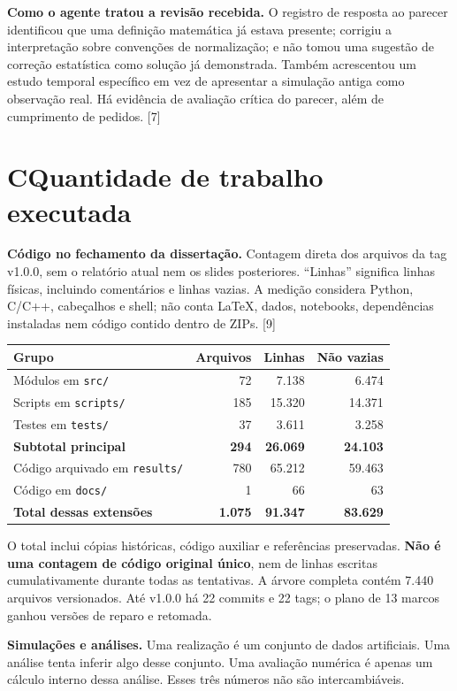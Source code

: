 \documentclass[11pt,a4paper]{article}
\newcommand{\fonte}[1]{{\small\color{navy}[#1]}}
\newcommand{\titulo}[2]{\section*{\color{navy}#1\quad #2}}
\begin{document}
\textbf{Como o agente tratou a revisão recebida.} O registro de resposta ao parecer identificou que uma definição matemática já estava presente; corrigiu a interpretação sobre convenções de normalização; e não tomou uma sugestão de correção estatística como solução já demonstrada. Também acrescentou um estudo temporal específico em vez de apresentar a simulação antiga como observação real. Há evidência de avaliação crítica do parecer, além de cumprimento de pedidos. \fonte{7}
\newpage

\titulo{C}{Quantidade de trabalho executada}
\textbf{Código no fechamento da dissertação.} Contagem direta dos arquivos da tag v1.0.0, sem o relatório atual nem os slides posteriores. ``Linhas'' significa linhas físicas, incluindo comentários e linhas vazias. A medição considera Python, C/C++, cabeçalhos e shell; não conta LaTeX, dados, notebooks, dependências instaladas nem código contido dentro de ZIPs. \fonte{9}

\begin{tabularx}{\textwidth}{@{}Yrrr@{}}
\toprule
\textbf{Grupo} & \textbf{Arquivos} & \textbf{Linhas} & \textbf{Não vazias}\\
\midrule
Módulos em \nolinkurl{src/} &72&7.138&6.474\\
Scripts em \nolinkurl{scripts/} &185&15.320&14.371\\
Testes em \nolinkurl{tests/} &37&3.611&3.258\\
\textbf{Subtotal principal} &\textbf{294}&\textbf{26.069}&\textbf{24.103}\\
Código arquivado em \nolinkurl{results/} &780&65.212&59.463\\
Código em \nolinkurl{docs/} &1&66&63\\
\textbf{Total dessas extensões} &\textbf{1.075}&\textbf{91.347}&\textbf{83.629}\\
\bottomrule
\end{tabularx}
O total inclui cópias históricas, código auxiliar e referências preservadas. \textbf{Não é uma contagem de código original único}, nem de linhas escritas cumulativamente durante todas as tentativas. A árvore completa contém 7.440 arquivos versionados. Até v1.0.0 há 22 commits e 22 tags; o plano de 13 marcos ganhou versões de reparo e retomada.

\textbf{Simulações e análises.} Uma realização é um conjunto de dados artificiais. Uma análise tenta inferir algo desse conjunto. Uma avaliação numérica é apenas um cálculo interno dessa análise. Esses três números não são intercambiáveis.
\end{document}
